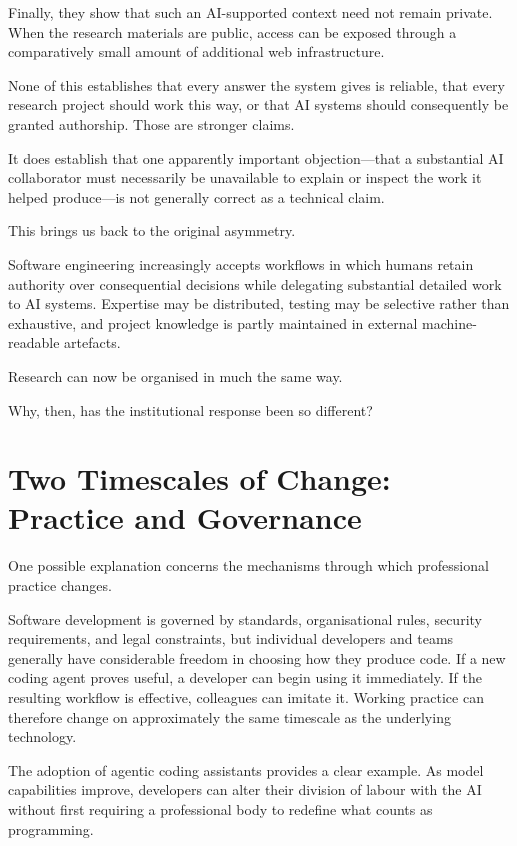 Finally, they show that such an AI-supported context need not remain private. When the research materials are public, access can be exposed through a comparatively small amount of additional web infrastructure.

None of this establishes that every answer the system gives is reliable, that every research project should work this way, or that AI systems should consequently be granted authorship. Those are stronger claims.

It does establish that one apparently important objection---that a substantial AI collaborator must necessarily be unavailable to explain or inspect the work it helped produce---is not generally correct as a technical claim.

This brings us back to the original asymmetry.

Software engineering increasingly accepts workflows in which humans retain authority over consequential decisions while delegating substantial detailed work to AI systems. Expertise may be distributed, testing may be selective rather than exhaustive, and project knowledge is partly maintained in external machine-readable artefacts.

Research can now be organised in much the same way.

Why, then, has the institutional response been so different?


\section{Two Timescales of Change: Practice and Governance}

One possible explanation concerns the mechanisms through which professional practice changes.

Software development is governed by standards, organisational rules, security requirements, and legal constraints, but individual developers and teams generally have considerable freedom in choosing how they produce code. If a new coding agent proves useful, a developer can begin using it immediately. If the resulting workflow is effective, colleagues can imitate it. Working practice can therefore change on approximately the same timescale as the underlying technology.

The adoption of agentic coding assistants provides a clear example. As model capabilities improve, developers can alter their division of labour with the AI without first requiring a professional body to redefine what counts as programming.

